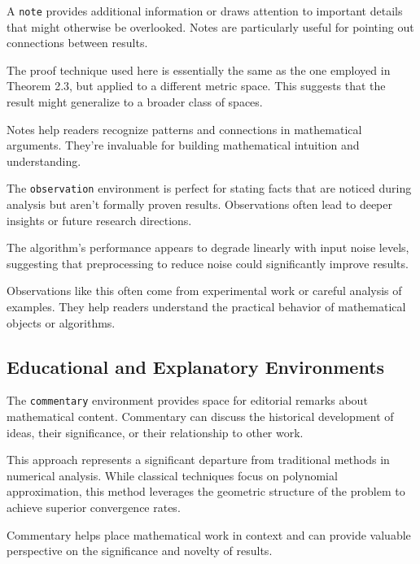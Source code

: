 \documentclass[9pt]{amsart}
\begin{document}
A \texttt{note} provides additional information or draws attention to important
details that might otherwise be overlooked. Notes are particularly useful for
pointing out connections between results.

\begin{note}
    The proof technique used here is essentially the same as the one employed in Theorem 2.3, but applied to a different metric space. This suggests that the result might generalize to a broader class of spaces.
\end{note}

Notes help readers recognize patterns and connections in mathematical
arguments. They're invaluable for building mathematical intuition and
understanding.

The \texttt{observation} environment is perfect for stating facts that are
noticed during analysis but aren't formally proven results. Observations often
lead to deeper insights or future research directions.

\begin{observation}
    The algorithm's performance appears to degrade linearly with input noise levels, suggesting that preprocessing to reduce noise could significantly improve results.
\end{observation}

Observations like this often come from experimental work or careful analysis of
examples. They help readers understand the practical behavior of mathematical
objects or algorithms.

\subsection{Educational and Explanatory Environments}

The \texttt{commentary} environment provides space for editorial remarks about
mathematical content. Commentary can discuss the historical development of
ideas, their significance, or their relationship to other work.

\begin{commentary}
    This approach represents a significant departure from traditional methods in numerical analysis. While classical techniques focus on polynomial approximation, this method leverages the geometric structure of the problem to achieve superior convergence rates.
\end{commentary}

Commentary helps place mathematical work in context and can provide valuable
perspective on the significance and novelty of results.
\end{document}
